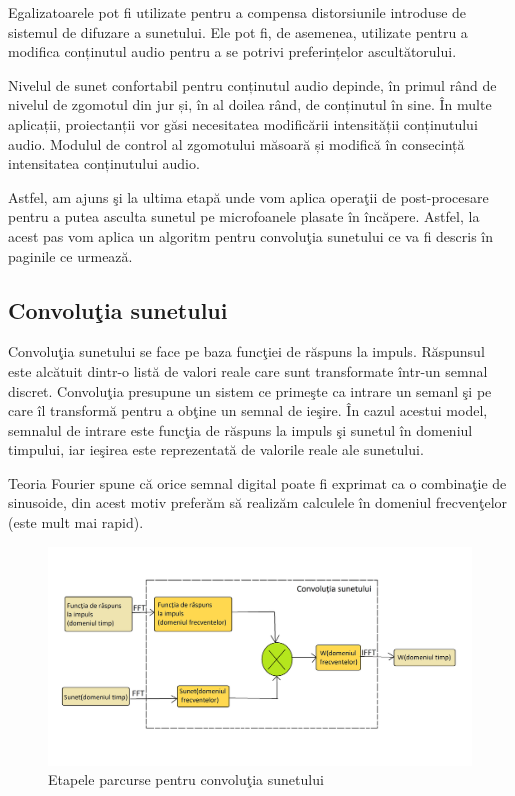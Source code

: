 	Egalizatoarele pot fi utilizate pentru a compensa distorsiunile introduse de sistemul de difuzare a sunetului. Ele pot fi, de asemenea, utilizate pentru a modifica conținutul audio pentru a se potrivi preferințelor ascultătorului.
	
	Nivelul de sunet confortabil pentru conținutul audio depinde, în primul rând de nivelul de zgomotul din jur și, în al doilea rând, de conținutul în sine. În multe aplicații, proiectanții vor găsi necesitatea modificării intensității conținutului audio. Modulul de control al zgomotului măsoară și modifică în consecință intensitatea conținutului audio.

	Astfel, am ajuns \c{s}i la ultima etap\u{a} unde vom aplica opera\c{t}ii de post-procesare pentru a putea asculta sunetul pe microfoanele plasate \^{i}n \^{i}nc\u{a}pere. Astfel, la acest pas vom aplica un algoritm pentru convolu\c{t}ia sunetului ce va fi descris \^{i}n paginile ce urmeaz\u{a}.

\subsection{Convolu\c{t}ia sunetului}

	Convolu\c{t}ia sunetului se face pe baza func\c{t}iei de r\u{a}spuns la impuls. R\u{a}spunsul este alc\u{a}tuit dintr-o list\u{a} de valori reale care sunt transformate \^{i}ntr-un semnal discret. Convolu\c{t}ia presupune un sistem ce prime\c{s}te ca intrare un semanl \c{s}i pe care \^{i}l transform\u{a} pentru a ob\c{t}ine un semnal de ie\c{s}ire. \^{I}n cazul acestui model, semnalul de intrare este func\c{t}ia de r\u{a}spuns la impuls \c{s}i sunetul \^{i}n domeniul timpului, iar ie\c{s}irea este reprezentat\u{a} de valorile reale ale sunetului.
	  
	
	Teoria Fourier spune c\u{a} orice semnal digital poate fi exprimat ca o combina\c{t}ie de sinusoide, din acest motiv prefer\u{a}m s\u{a} realiz\u{a}m calculele \^{i}n domeniul frecven\c{t}elor (este mult mai rapid).
		
	\begin{figure}[!htb]
		\centering
		\includegraphics[width=15cm]{imagini/convolutiaSunetului.png}
		\caption{Etapele parcurse pentru convolu\c{t}ia sunetului}
		\label{Fig14}
	\end{figure}

